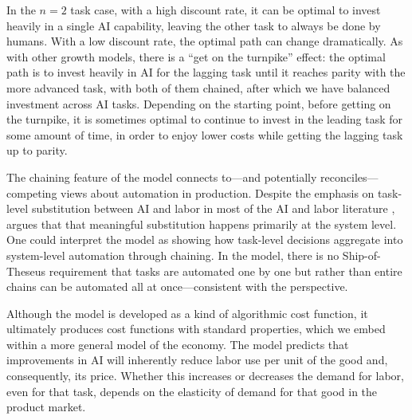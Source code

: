 \documentclass{article}
\theoremstyle{plain}
\theoremstyle{plain}
\begin{document}
In the $n = 2$ task case, with a high discount rate, it can be optimal to invest heavily in a single AI capability, leaving the other task to always be done by humans.
With a low discount rate, the optimal path can change dramatically. 
As with other growth models, there is a ``get on the turnpike'' effect: the optimal path is to invest heavily in AI for the lagging task until it reaches parity with the more advanced task, with both of them chained, after which we have balanced investment across AI tasks.
Depending on the starting point, before getting on the turnpike, it is sometimes optimal to continue to invest in the leading task for some amount of time, in order to enjoy lower costs while getting the lagging task up to parity.


The chaining feature of the model connects to---and potentially reconciles---competing views about automation in production. 
Despite the emphasis on task-level substitution between AI and labor in most of the AI and labor literature \citep{autor2003skill, acemoglu2018automation}, \cite{bresnahan2002information} argues that that meaningful substitution happens primarily at the system level. 
One could interpret the model as showing how task-level decisions aggregate into system-level automation through chaining.
In the model, there is no Ship-of-Theseus requirement that tasks are automated one by one but rather than entire chains can be automated all at once---consistent with the \cite{bresnahan2002information} perspective.

Although the model is developed as a kind of algorithmic cost function, it ultimately produces cost functions with standard properties, which we embed within a more general model of the economy.  
The model predicts that improvements in AI will inherently reduce labor use per unit of the good and, consequently, its price.  
Whether this increases or decreases the demand for labor, even for that task, depends on the elasticity of demand for that good in the product market.  
\end{document}
